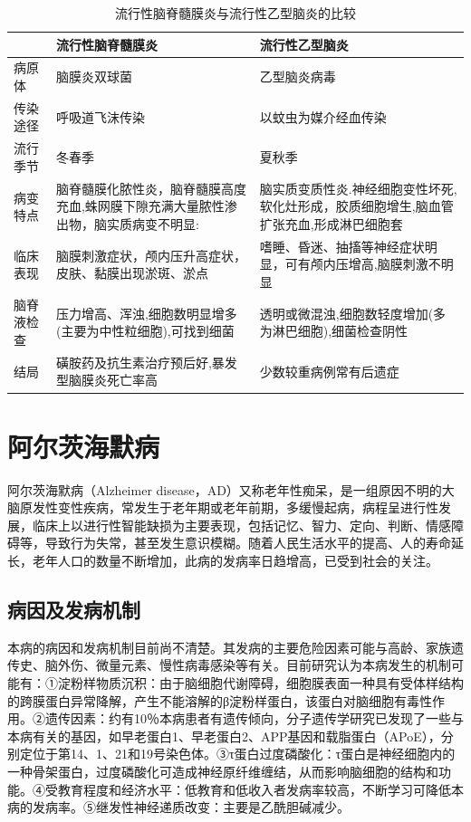 \begin{table}[ht]
	\caption{流行性脑脊髓膜炎与流行性乙型脑炎的比较}
	\label{tab13-1}
	\centering
	\begin{tabular}{lp{5cm}p{5cm}}
	\toprule
	&流行性脑脊髓膜炎&流行性乙型脑炎\\
	\midrule
	病原体&脑膜炎双球菌&乙型脑炎病毒\\
	传染途径&呼吸道飞沫传染&以蚊虫为媒介经血传染\\
	流行季节&冬春季  &夏秋季\\
	病变特点&脑脊髓膜化脓性炎，脑脊髓膜高度充血,蛛网膜下隙充满大量脓性渗出物，脑实质病变不明显:&脑实质变质性炎.神经细胞变性坏死,软化灶形成，胶质细胞增生,脑血管扩张充血,形成淋巴细胞套 \\
	临床表现&脑膜刺激症状，颅内压升高症状，皮肤、黏膜出现淤斑、淤点&嗜睡、昏迷、抽搐等神经症状明显，可有颅内压增高,脑膜刺激不明显\\
	脑脊液检查&压力增高、浑浊,细胞数明显增多(主要为中性粒细胞),可找到细菌&透明或微混浊,细胞数轻度增加(多为淋巴细胞),细菌检查阴性\\
	结局&磺胺药及抗生素治疗预后好,暴发型脑膜炎死亡率高&少数较重病例常有后遗症\\
	\bottomrule
	\end{tabular}
\end{table}

\section{阿尔茨海默病}

阿尔茨海默病（Alzheimer
disease，AD）又称老年性痴呆，是一组原因不明的大脑原发性变性疾病，常发生于老年期或老年前期，多缓慢起病，病程呈进行性发展，临床上以进行性智能缺损为主要表现，包括记忆、智力、定向、判断、情感障碍等，导致行为失常，甚至发生意识模糊。随着人民生活水平的提高、人的寿命延长，老年人口的数量不断增加，此病的发病率日趋增高，已受到社会的关注。

\subsection{病因及发病机制}

本病的病因和发病机制目前尚不清楚。其发病的主要危险因素可能与高龄、家族遗传史、脑外伤、微量元素、慢性病毒感染等有关。目前研究认为本病发生的机制可能有：①淀粉样物质沉积：由于脑细胞代谢障碍，细胞膜表面一种具有受体样结构的跨膜蛋白异常降解，产生不能溶解的β淀粉样蛋白，该蛋白对脑细胞有毒性作用。②遗传因素：约有10％本病患者有遗传倾向，分子遗传学研究已发现了一些与本病有关的基因，如早老蛋白1、早老蛋白2、APP基因和载脂蛋白（APoE），分别定位于第14、1、21和19号染色体。③τ蛋白过度磷酸化：τ蛋白是神经细胞内的一种骨架蛋白，过度磷酸化可造成神经原纤维缠结，从而影响脑细胞的结构和功能。④受教育程度和经济水平：低教育和低收入者发病率较高，不断学习可降低本病的发病率。⑤继发性神经递质改变：主要是乙酰胆碱减少。

